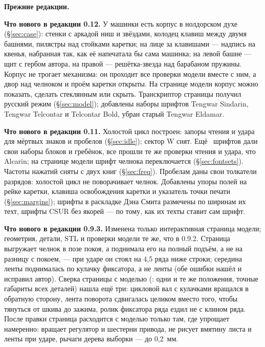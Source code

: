 {\small\noindent\textbf{Прежние редакции.}\par\smallskip
\textbf{Что нового в редакции 0.12.} У машинки есть корпус в нолдорском духе (\S\ref{sec:case}): стенки с аркадой ниш и звёздами, колодец клавиш между двумя башнями, пилястры над стойками каретки; на лице за клавишами — надпись на квенья, набранная так, как её напечатала бы сама машинка; на левой башне — щит с гербом автора, на правой — решётка-звезда над барабаном пружины. Корпус не трогает механизма: он проходит все проверки модели вместе с ним, а двор над челноком и проём каретки открыты. На странице модели корпус можно показать, сделать стеклянным или скрыть. Транскриптор страницы получил русский режим (\S\ref{sec:model}); добавлены наборы шрифтов Tengwar Sindarin, Tengwar Telcontar и Telcontar Bold, убран старый Tengwar Eldamar.

\textbf{Что нового в редакции 0.11.} Холостой цикл построен: запоры чтения и удара для мёртвых знаков и пробелов (\S\ref{sec:idle}); сектор W снят. Ещё \the\numexpr{}\relax\ шрифтов дали свои наборы блоков и гребёнок, все прошли те же проверки чтения и удара, что Alcarin; на странице модели шрифт челнока переключается (\S\ref{sec:fontsets}). Частоты нажатий сняты с двух книг (\S\ref{sec:freq}). Пробелам даны свои толкатели разрядов: холостой цикл не поворачивает челнок. Добавлены упоры полей на рейке каретки, клавиша освобождения каретки и указатель точки печати (\S\ref{sec:margins}); шрифты в раскладке Дэна Смита размечены по ширинам их техт, шрифты CSUR без якорей — по тому, как их техты ставит сам шрифт.

\textbf{Что нового в редакции 0.9.3.} Изменена только интерактивная страница модели; геометрия, детали, STL и проверки модели те же, что в 0.9.2. Страница выгружает челнок в позе покоя, а поднимала его на полный подъём, а не на разницу с покоем, — при ударе он стоял на 4,5 ряда ниже строки; середина ленты поднималась по кулачку фиксатора, а не ленты (обе ошибки нашёл и исправил автор). Сверка страницы с моделью (: одни и те же положения, точные габариты всех деталей) нашла ещё три: цикловой вал с кулачками вращался в обратную сторону, лента поворота сдвигалась целиком вместо того, чтобы тянуться от шкива до зажима, ролик фиксатора ряда ездил не с клином ряда. После правки страница расходится с моделью только там, где упрощает намеренно: вращает регулятор и шестерни привода, не рисует вмятину листа и ленты при ударе, рычаги дерева выборки — до 0,2~мм.

}
